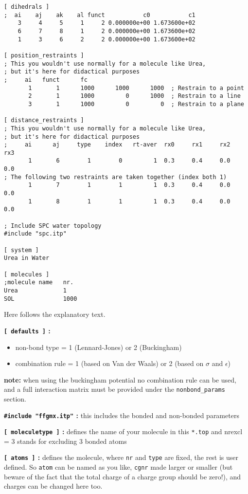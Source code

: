 {\begin{verbatim}
[ dihedrals ]
;  ai    aj    ak    al funct           c0           c1
    3     4     5     1     2 0.000000e+00 1.673600e+02 
    6     7     8     1     2 0.000000e+00 1.673600e+02 
    1     3     6     2     2 0.000000e+00 1.673600e+02 

[ position_restraints ]
; This you wouldn't use normally for a molecule like Urea,
; but it's here for didactical purposes
;     ai   funct      fc
       1       1      1000      1000      1000	; Restrain to a point
       2       1      1000         0      1000  ; Restrain to a line
       3       1      1000         0         0  ; Restrain to a plane
   
[ distance_restraints ]
; This you wouldn't use normally for a molecule like Urea,
; but it's here for didactical purposes
;     ai      aj     type    index   rt-aver  rx0     rx1     rx2     rx3
       1       6        1        0         1  0.3     0.4     0.0     0.0 
; The following two restraints are taken together (index both 1)
       1       7        1        1         1  0.3     0.4     0.0     0.0 
       1       8        1        1         1  0.3     0.4     0.0     0.0 

; Include SPC water topology
#include "spc.itp"

[ system ]
Urea in Water

[ molecules ]
;molecule name   nr.
Urea             1
SOL              1000
\end{verbatim}
}
Here follows the explanatory text.

{\bf \verb'[ defaults ]' :}
\begin{itemize}
\item non-bond type = 1 (Lennard-Jones) or 2
(Buckingham)
\item combination rule = 1 (based on Van der Waals) or 2 (based on
$\sigma$ and $\epsilon$)
\end{itemize}
{\bf note:} when using the buckingham potential no combination rule can
be used, and a full interaction matrix must be provided under the 
{\tt nonbond\_params} section.

{\bf \verb'#include "ffgmx.itp"' :} this includes the bonded and
non-bonded {\gromacs} parameters

{\bf \verb'[ moleculetype ]' :} defines the name of your molecule in this
\verb'*.top' and nrexcl = 3 stands for excluding 3 bonded atoms

{\bf \verb'[ atoms ]' :} defines the molecule, where {\tt nr} and {\tt type}
are fixed, the rest is user defined. So {\tt atom} can be named as you
like, {\tt cgnr} made larger or smaller (but beware of the fact that
the total charge of a charge group should be zero!), and charges can
be changed here too.

